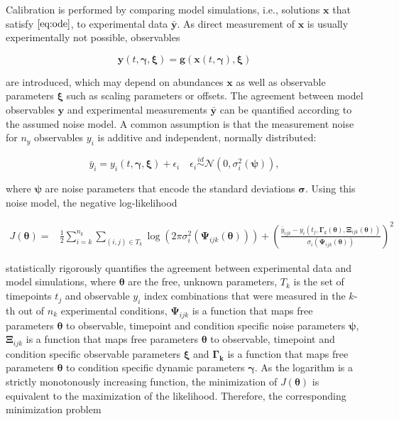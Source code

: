 \documentclass[11pt]{article}
\newcommand{\dims}[1]{{n_{#1}}}
\begin{document}
Calibration is performed by comparing model simulations, i.e., solutions
\(\textbf{x}\) that satisfy \(\eqref{eq:ode}\), to experimental data
\(\bar{\textbf{y}}\). As direct measurement of \(\textbf{x}\) is usually
experimentally not possible, observables

\begin{equation}
\textbf{y}(t,\boldsymbol{\gamma},\boldsymbol{\xi}) = \textbf{g}(\textbf{x}(t,\boldsymbol{\gamma}),\boldsymbol{\xi})
\label{eq:observable}
\end{equation}

are introduced, which may depend on abundances \(\textbf{x}\) as well as
observable parameters \(\boldsymbol{\xi}\) such as scaling parameters or
offsets. The agreement between model observables \(\textbf{y}\) and
experimental measurements \(\bar{\textbf{y}}\) can be quantified
according to the assumed noise model. A common assumption is that the
measurement noise for \(\dims{y}\) observables \(y_i\) is additive and
independent, normally distributed:

\begin{equation}
\bar{y}_{i} = y_i(t,\boldsymbol{\gamma},\boldsymbol{\xi}) + \epsilon_{i} \quad \epsilon_{i} \overset{id}{\sim} \mathcal{N}(0,\sigma_{i}^2(\boldsymbol{\psi})),
\label{eq:noise}
\end{equation}

where \(\boldsymbol{\psi}\) are noise parameters that encode the
standard deviations \(\boldsymbol{\sigma}\). Using this noise model, the
negative log-likelihood

\begin{equation}
\begin{aligned}
J(\boldsymbol{\theta}) =&  \frac{1}{2} \sum_{i=k}^\dims{k} \sum_{(i,j) \in T_k} \log\left(2\pi\sigma_{i}^2(\boldsymbol{\Psi}_{ijk}(\boldsymbol{\theta}))\right) + \left(\frac{\bar{y}_{ijk} - y_{i}(t_j,\boldsymbol{\Gamma}_k(\boldsymbol{\theta}),\boldsymbol{\Xi}_{ijk}(\boldsymbol{\theta}))}{\sigma_{i}(\boldsymbol{\Psi}_{ijk}(\boldsymbol{\theta}))}\right)^2
\label{eq:objective}
\end{aligned}
\end{equation}

statistically rigorously quantifies the agreement between experimental
data and model simulations, where \(\boldsymbol{\theta}\) are the free,
unknown parameters, \(T_k\) is the set of timepoints \(t_j\) and
observable \(y_i\) index combinations that were measured in the \(k\)-th
out of \(\dims{k}\) experimental conditions, \(\boldsymbol{\Psi}_{ijk}\)
is a function that maps free parameters \(\boldsymbol{\theta}\) to
observable, timepoint and condition specific noise parameters
\(\boldsymbol{\psi}\), \(\boldsymbol{\Xi}_{ijk}\) is a function that
maps free parameters \(\boldsymbol{\theta}\) to observable, timepoint
and condition specific observable parameters \(\boldsymbol{\xi}\) and
\(\boldsymbol{\Gamma_{k}}\) is a function that maps free parameters
\(\boldsymbol{\theta}\) to condition specific dynamic parameters
\(\boldsymbol{\gamma}\). As the logarithm is a strictly monotonously
increasing function, the minimization of \(J(\boldsymbol{\theta})\) is
equivalent to the maximization of the likelihood. Therefore, the
corresponding minimization problem
\end{document}
